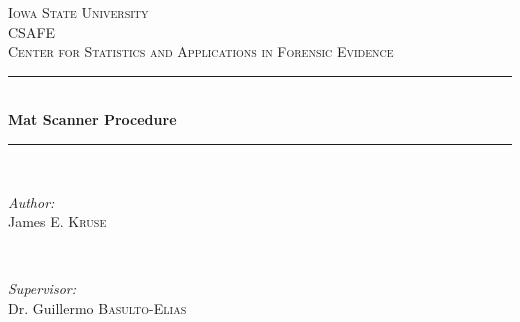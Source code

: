 \begin{titlepage}

\newcommand{\HRule}{\rule{\linewidth}{0.5mm}} %

\center %
 

\textsc{\LARGE Iowa State University}\\[1.5cm] %
\textsc{\Large CSAFE}\\[0.5cm] %
\textsc{\large Center for Statistics and Applications in Forensic Evidence }\\[0.5cm] %


\HRule \\[0.4cm]
{ \huge \bfseries Mat Scanner Procedure  }\\[0.4cm] %
\HRule \\[1.5cm]
 

\begin{minipage}{0.4\textwidth}
\begin{flushleft} \large
\emph{Author:}\\
James \textsc{E. Kruse} %
\end{flushleft}
\end{minipage}
~
\begin{minipage}{0.4\textwidth}
\begin{flushright} \large
\emph{Supervisor:} \\
Dr. Guillermo \textsc{Basulto-Elias} %
\end{flushright}
\end{minipage}\\[2cm]


\end{titlepage}
